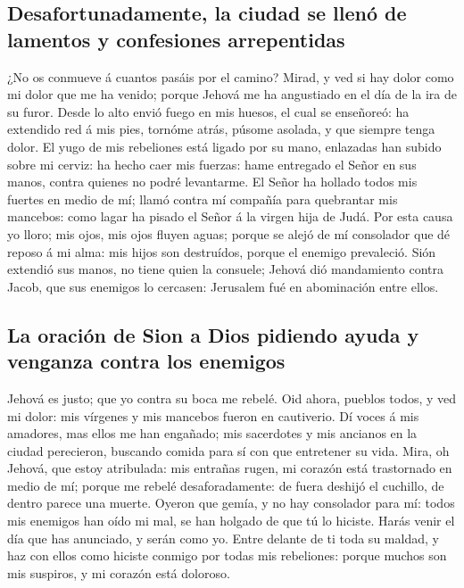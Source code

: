 \hypertarget{desafortunadamente-la-ciudad-se-llenuxf3-de-lamentos-y-confesiones-arrepentidas}{%
\subsection{Desafortunadamente, la ciudad se llenó de lamentos y
confesiones
arrepentidas}\label{desafortunadamente-la-ciudad-se-llenuxf3-de-lamentos-y-confesiones-arrepentidas}}

 ¿No os conmueve á cuantos pasáis por el camino? Mirad, y
ved si hay dolor como mi dolor que me ha venido; porque Jehová me ha
angustiado en el día de la ira de su furor.  Desde lo alto
envió fuego en mis huesos, el cual se enseñoreó: ha extendido red á mis
pies, tornóme atrás, púsome asolada, y que siempre tenga dolor.
 El yugo de mis rebeliones está ligado por su mano,
enlazadas han subido sobre mi cerviz: ha hecho caer mis fuerzas: hame
entregado el Señor en sus manos, contra quienes no podré levantarme.
 El Señor ha hollado todos mis fuertes en medio de mí;
llamó contra mí compañía para quebrantar mis mancebos: como lagar ha
pisado el Señor á la virgen hija de Judá.  Por esta causa
yo lloro; mis ojos, mis ojos fluyen aguas; porque se alejó de mí
consolador que dé reposo á mi alma: mis hijos son destruídos, porque el
enemigo prevaleció.  Sión extendió sus manos, no tiene
quien la consuele; Jehová dió mandamiento contra Jacob, que sus enemigos
lo cercasen: Jerusalem fué en abominación entre ellos.

\hypertarget{la-oraciuxf3n-de-sion-a-dios-pidiendo-ayuda-y-venganza-contra-los-enemigos}{%
\subsection{La oración de Sion a Dios pidiendo ayuda y venganza contra
los
enemigos}\label{la-oraciuxf3n-de-sion-a-dios-pidiendo-ayuda-y-venganza-contra-los-enemigos}}

 Jehová es justo; que yo contra su boca me rebelé. Oid
ahora, pueblos todos, y ved mi dolor: mis vírgenes y mis mancebos fueron
en cautiverio.  Dí voces á mis amadores, mas ellos me han
engañado; mis sacerdotes y mis ancianos en la ciudad perecieron,
buscando comida para sí con que entretener su vida.  Mira,
oh Jehová, que estoy atribulada: mis entrañas rugen, mi corazón está
trastornado en medio de mí; porque me rebelé desaforadamente: de fuera
deshijó el cuchillo, de dentro parece una muerte.  Oyeron
que gemía, y no hay consolador para mí: todos mis enemigos han oído mi
mal, se han holgado de que tú lo hiciste. Harás venir el día que has
anunciado, y serán como yo.  Entre delante de ti toda su
maldad, y haz con ellos como hiciste conmigo por todas mis rebeliones:
porque muchos son mis suspiros, y mi corazón está doloroso.

